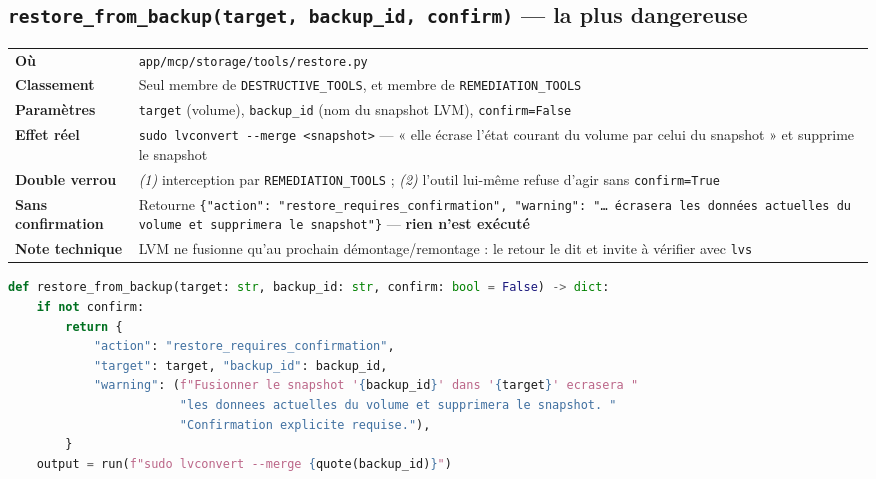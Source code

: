 \documentclass[11pt,a4paper]{report}
\newcommand{\file}[1]{\texttt{\small #1}}
\newcommand{\fn}[1]{\texttt{\small\textcolor{oasisviolet}{#1}}}
\begin{document}
\subsection{\fn{restore\_from\_backup(target, backup\_id, confirm)} --- la plus dangereuse}

\begin{longtable}{@{}p{3.2cm}p{11.6cm}@{}}
\toprule
\endhead
\textbf{Où} & \file{app/mcp/storage/tools/restore.py}\\
\textbf{Classement} & Seul membre de \texttt{DESTRUCTIVE\_TOOLS}, et membre de \texttt{REMEDIATION\_TOOLS}\\
\textbf{Paramètres} & \texttt{target} (volume), \texttt{backup\_id} (nom du snapshot LVM), \texttt{confirm=False}\\
\textbf{Effet réel} & \texttt{sudo lvconvert -{}-merge <snapshot>} --- « elle écrase l'état courant du volume par celui du snapshot » et supprime le snapshot\\
\textbf{Double verrou} & \emph{(1)} interception par \texttt{REMEDIATION\_TOOLS} ; \emph{(2)} l'outil lui-même refuse d'agir sans \texttt{confirm=True}\\
\textbf{Sans confirmation} & Retourne \texttt{\{"action": "restore\_requires\_confirmation", "warning": "\ldots{} écrasera les données actuelles du volume et supprimera le snapshot"\}} --- \textbf{rien n'est exécuté}\\
\textbf{Note technique} & LVM ne fusionne qu'au prochain démontage/remontage : le retour le dit et invite à vérifier avec \texttt{lvs}\\
\bottomrule
\end{longtable}

\begin{lstlisting}[language=Python,caption={Le refus par défaut, dans l'outil lui-même}]
def restore_from_backup(target: str, backup_id: str, confirm: bool = False) -> dict:
    if not confirm:
        return {
            "action": "restore_requires_confirmation",
            "target": target, "backup_id": backup_id,
            "warning": (f"Fusionner le snapshot '{backup_id}' dans '{target}' ecrasera "
                        "les donnees actuelles du volume et supprimera le snapshot. "
                        "Confirmation explicite requise."),
        }
    output = run(f"sudo lvconvert --merge {quote(backup_id)}")
\end{lstlisting}

\end{document}
